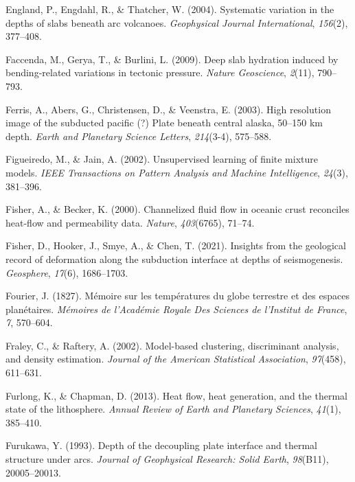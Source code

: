 \begin{CSLReferences}{1}{1}
\leavevmode{}%
England, P., Engdahl, R., \& Thatcher, W. (2004). Systematic variation in the depths of slabs beneath arc volcanoes. \emph{Geophysical Journal International}, \emph{156}(2), 377--408.

\leavevmode{}%
Faccenda, M., Gerya, T., \& Burlini, L. (2009). Deep slab hydration induced by bending-related variations in tectonic pressure. \emph{Nature Geoscience}, \emph{2}(11), 790--793.

\leavevmode{}%
Ferris, A., Abers, G., Christensen, D., \& Veenstra, E. (2003). High resolution image of the subducted pacific (?) Plate beneath central alaska, 50--150 km depth. \emph{Earth and Planetary Science Letters}, \emph{214}(3-4), 575--588.

\leavevmode{}%
Figueiredo, M., \& Jain, A. (2002). Unsupervised learning of finite mixture models. \emph{IEEE Transactions on Pattern Analysis and Machine Intelligence}, \emph{24}(3), 381--396.

\leavevmode{}%
Fisher, A., \& Becker, K. (2000). Channelized fluid flow in oceanic crust reconciles heat-flow and permeability data. \emph{Nature}, \emph{403}(6765), 71--74.

\leavevmode{}%
Fisher, D., Hooker, J., Smye, A., \& Chen, T. (2021). Insights from the geological record of deformation along the subduction interface at depths of seismogenesis. \emph{Geosphere}, \emph{17}(6), 1686--1703.

\leavevmode{}%
Fourier, J. (1827). Mémoire sur les températures du globe terrestre et des espaces planétaires. \emph{Mémoires de l'Académie Royale Des Sciences de l'Institut de France}, \emph{7}, 570--604.

\leavevmode{}%
Fraley, C., \& Raftery, A. (2002). Model-based clustering, discriminant analysis, and density estimation. \emph{Journal of the American Statistical Association}, \emph{97}(458), 611--631.

\leavevmode{}%
Furlong, K., \& Chapman, D. (2013). Heat flow, heat generation, and the thermal state of the lithosphere. \emph{Annual Review of Earth and Planetary Sciences}, \emph{41}(1), 385--410.

\leavevmode{}%
Furukawa, Y. (1993). Depth of the decoupling plate interface and thermal structure under arcs. \emph{Journal of Geophysical Research: Solid Earth}, \emph{98}(B11), 20005--20013.


\end{CSLReferences}
